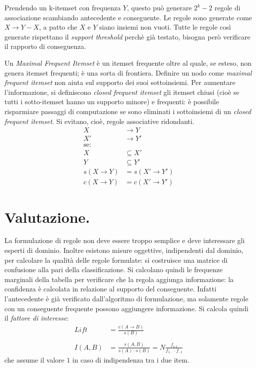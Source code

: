 \documentclass[11pt, a4page, twocolumn]{article}
\begin{document}
Prendendo un k-itemset con frequenza $Y$, questo può generare $2^k - 2$ regole di associazione scambiando antecedente e conseguente.
Le regole sono generate come $X \rightarrow Y - X$, a patto che $X$ e $Y$ siano insiemi non vuoti.
Tutte le regole così generate rispettano il \textit{support threshold} perchè già testato, bisogna però verificare il rapporto di conseguenza.

Un \textit{Maximal Frequent Itemset} è un itemset frequente oltre al quale, se esteso, non genera itemset frequenti; è una sorta di frontiera.
Definire un nodo come \textit{maximal frequent itemset} non aiuta sul supporto dei suoi sottoinsiemi.
Per aumentare l'informazione, si definiscono \textit{closed frequent itemset} gli itemset chiusi (cioè se tutti i sotto-itemset hanno un supporto minore) e frequenti: è possibile risparmiare passaggi di computazione se sono eliminati i sottoinsiemi di un \textit{closed frequent itemset}.
Si evitano, cioè, regole associative ridondanti.
\begin{align*}
  X &\rightarrow Y \\
  X' &\rightarrow Y' \\
  \text{se:}& \\
  X &\subseteq X' \\
  Y &\subseteq Y' \\
  s(X \rightarrow Y) &= s(X' \rightarrow Y') \\
  c(X \rightarrow Y) &= c(X' \rightarrow Y')
\end{align*}


\section{Valutazione.}
La formulazione di regole non deve essere troppo semplice e deve interessare gli esperti di dominio.
Inoltre esistono misure oggettive, indipendenti dal dominio, per calcolare la qualità delle regole formulate: si costruisce una matrice di confusione alla pari della classificazione.
Si calcolano quindi le frequenze marginali della tabella per verificare che la regola aggiunga informazione: la confidenza è calcolata in relazione al supporto del conseguente.
Infatti l'antecedente è già verificato dall'algoritmo di formulazione, ma solamente regole con un conseguente frequente possono aggiungere informazione.
Si calcola quindi il \textit{fattore di interesse}:
\begin{align*}
  Lift &= \frac{c(A \rightarrow B)}{s(B)} \\ \\
  I(A, B) &= \frac{s(A, B)}{s(A) \cdot s(B)} = N \frac{f_{1.1}}{f_{1.\cdot} \cdot f_{\cdot.1}}
\end{align*}
che assume il valore $1$ in caso di indipendenza tra i due item. %
\end{document}
